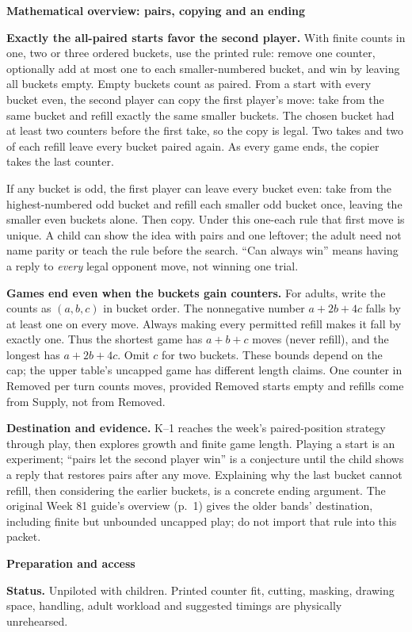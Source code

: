 \documentclass[11pt]{article}
\newcommand{\head}[1]{\par\textbf{\large #1}\par}
\begin{document}
\head{Mathematical overview: pairs, copying and an ending}
\textbf{Exactly the all-paired starts favor the second player.} With finite counts in one, two or three ordered buckets, use the printed rule: remove one counter, optionally add at most one to each smaller-numbered bucket, and win by leaving all buckets empty. Empty buckets count as paired. From a start with every bucket even, the second player can copy the first player's move: take from the same bucket and refill exactly the same smaller buckets. The chosen bucket had at least two counters before the first take, so the copy is legal. Two takes and two of each refill leave every bucket paired again. As every game ends, the copier takes the last counter.

If any bucket is odd, the first player can leave every bucket even: take from the highest-numbered odd bucket and refill each smaller odd bucket once, leaving the smaller even buckets alone. Then copy. Under this one-each rule that first move is unique. A child can show the idea with pairs and one leftover; the adult need not name parity or teach the rule before the search. ``Can always win'' means having a reply to \emph{every} legal opponent move, not winning one trial.

\textbf{Games end even when the buckets gain counters.} For adults, write the counts as $(a,b,c)$ in bucket order. The nonnegative number $a+2b+4c$ falls by at least one on every move. Always making every permitted refill makes it fall by exactly one. Thus the shortest game has $a+b+c$ moves (never refill), and the longest has $a+2b+4c$. Omit $c$ for two buckets. These bounds depend on the cap; the upper table's uncapped game has different length claims. One counter in Removed per turn counts moves, provided Removed starts empty and refills come from Supply, not from Removed.

\textbf{Destination and evidence.} K--1 reaches the week's paired-position strategy through play, then explores growth and finite game length. Playing a start is an experiment; ``pairs let the second player win'' is a conjecture until the child shows a reply that restores pairs after any move. Explaining why the last bucket cannot refill, then considering the earlier buckets, is a concrete ending argument. The original Week 81 guide's overview (p.\ 1) gives the older bands' destination, including finite but unbounded uncapped play; do not import that rule into this packet.

\head{Preparation and access}
\textbf{Status.} Unpiloted with children. Printed counter fit, cutting, masking, drawing space, handling, adult workload and suggested timings are physically unrehearsed.
\end{document}
